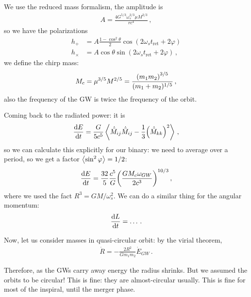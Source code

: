\documentclass[main.tex]{subfiles}
\begin{document}
We use the reduced mass formalism, the amplitude is 
%
\begin{align}
A = \frac{4 G^{5/3} \omega_{s}^{2/3} \mu M^{2/3}}{r c^{4}}
\,,
\end{align}
%
so we have the polarizations 
%
\begin{subequations}
\begin{align}
h_{+} &= A \frac{1 - \cos^2\theta   }{2} \cos(2 \omega_{s} t _{\text{ret}} + 2 \varphi ) \\ 
h_{\times } &= A \cos \theta  \sin(2 \omega_{s} t _{\text{ret}} + 2 \varphi )  
\,,
\end{align}
\end{subequations}
%
we define the chirp mass: 
%
\begin{align}
M_c = \mu ^{3/5} M^{2/5} = \frac{\qty(m_1 m_2 )^{3/5}}{(m_1 + m_2 )^{1/5}}
\,,
\end{align}
%
also the frequency of the GW is twice the frequency of the orbit. 

Coming back to the radiated power: it is 
%
\begin{align}
\dv{E}{t} = \frac{G}{5 c^{5}} \expval{\dot{\ddot{M}}_{ij} \dot{\ddot{M}}_{ij} - \frac{1}{3} \qty(\dot{\ddot{M}}_{kk})^2}
\,,
\end{align}
%
so we can calculate this explicitly for our binary: we need to average over a period, so we get a factor \(\expval{\sin^2\varphi } = 1/2\): 
%
\begin{align}
\dv{E}{t} = \frac{32}{5} \frac{c^{5}}{G} \qty(\frac{GM_c \omega_{GW}}{2 c^{3}})^{ 10 /3}
\,,
\end{align}
%
where we used the fact \(R^3 = GM / \omega_{s}^2\).
We can do a similar thing for the angular momentum: 
%
\begin{align}
\dv{L}{t} = \dots
\,.
\end{align}

Now, let us consider masses in quasi-circular orbit: by the virial theorem, 
%
\begin{align}
\dot{R} = - \frac{2R^2}{G m_1 m_2 } \dot{E}_{GW}
\,.
\end{align}

Therefore, as the GWs carry away energy the radius shrinks. 
But we assumed the orbits to be circular! This is fine: they are almost-circular usually. 
This is fine for most of the inspiral, until the merger phase. 
\end{document}
